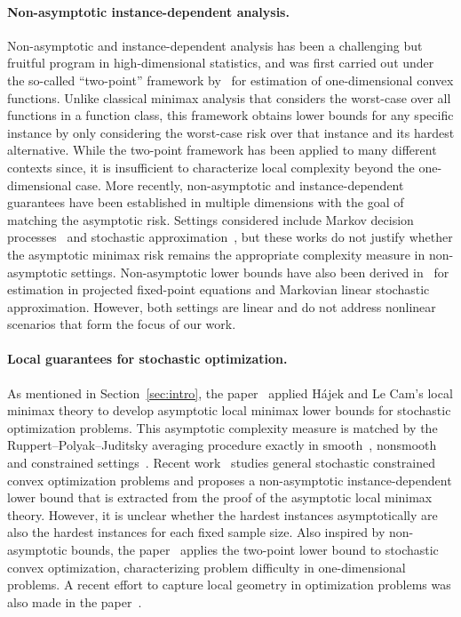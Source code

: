 \documentclass[11pt,twoside]{article}
\numberwithin{equation}{section}
\newcommand{\1}{\mathbf{1}}
\theoremstyle{remark}
\theoremstyle{plain}
\begin{document}
\paragraph{Non-asymptotic instance-dependent analysis.}
Non-asymptotic and instance-dependent analysis has been a challenging but fruitful program in high-dimensional statistics, and was first carried out under the so-called ``two-point'' framework by~\cite{cai2015framework} for estimation of one-dimensional convex functions.  Unlike classical minimax analysis that considers the worst-case over all functions in a function class, this framework obtains lower bounds for any specific instance by only considering the worst-case risk over that instance and its hardest alternative. While the two-point framework has been applied to many different contexts since, it is insufficient to characterize local complexity beyond the one-dimensional case.
More recently, non-asymptotic and instance-dependent guarantees have been established in multiple dimensions with the goal of matching the asymptotic risk. Settings considered include Markov decision processes~\cite{pananjady2020instance,khamaru2021temporal,khamaru2021instance,li2023accelerated, li2020breaking, li2024settling} and stochastic approximation~\cite{mou2022optimal,haque2023tight}, but these works do not justify whether the asymptotic minimax risk remains the appropriate complexity measure in non-asymptotic settings.
Non-asymptotic lower bounds have also been derived in~\cite{mou2022optimal1, mou2023optimal} for estimation in projected fixed-point equations and Markovian linear stochastic approximation. However, both settings are linear and do not address nonlinear scenarios that form the focus of our work. 


\paragraph{Local guarantees for stochastic optimization.} As mentioned in Section~\ref{sec:intro}, the paper~\cite{duchi2021asymptotic} applied H\'ajek and Le Cam's local minimax theory to develop asymptotic local minimax lower bounds for stochastic optimization problems. This asymptotic complexity measure is matched by the Ruppert--Polyak--Juditsky averaging procedure exactly in smooth~\cite{ruppert1988efficient,polyak1992acceleration}, nonsmooth and constrained settings~\cite{davis2024asymptotic}.
Recent work~\cite{khamaru2024stochastic} studies general stochastic constrained convex optimization problems and proposes a non-asymptotic instance-dependent lower bound that is extracted from the proof of the asymptotic local minimax theory. However, it is unclear whether the hardest instances asymptotically are also the hardest instances for each fixed sample size. 
Also inspired by non-asymptotic bounds, the paper~\cite{duchi2016local} applies the two-point lower bound to stochastic convex optimization, characterizing problem difficulty in one-dimensional problems. A recent effort to capture local geometry in optimization problems was also made in the paper~\cite{cutler2024radius}.
\end{document}
